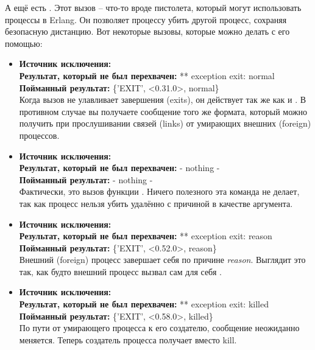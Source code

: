 А ещё есть .
Этот вызов \--- что\--то вроде пистолета, который могут использовать процессы в Erlang.
Он позволяет процессу убить другой процесс, сохраняя безопасную дистанцию.
Вот некоторые вызовы, которые можно делать с его помощью:
\begin{itemize}
    \item 
        \textbf{Источник исключения:} \\
    \textbf{Результат, который не был перехвачен:} ** exception exit: normal\\
    \textbf{Пойманный результат:} \{'EXIT', <0.31.0>, normal\}\\
    Когда вызов  не улавливает завершения (exits), он действует так же как и .
    В противном случае вы получаете сообщение того же формата, который можно получить при прослушивании связей (links) от умирающих внешних (foreign) процессов.
\item 
    \textbf{Источник исключения:} \\
    \textbf{Результат, который не был перехвачен:} - nothing -\\
    \textbf{Пойманный результат:} - nothing -\\
    Фактически, это вызов функции .
    Ничего полезного эта команда не делает, так как процесс нельзя убить удалённо с причиной  в качестве аргумента.
\item
    \textbf{Источник исключения:} \\
    \textbf{Результат, который не был перехвачен:} ** exception exit: reason\\
    \textbf{Пойманный результат:} \{'EXIT', <0.52.0>, reason\}\\
    Внешний (foreign) процесс завершает себя по причине \emph{reason}.
    Выглядит это так, как будто внешний процесс вызвал сам для себя .
\item
    \textbf{Источник исключения:} \\
    \textbf{Результат, который не был перехвачен:} ** exception exit: killed\\
    \textbf{Пойманный результат:} \{'EXIT', <0.58.0>, killed\}\\
    По пути от умирающего процесса к его создателю, сообщение неожиданно меняется.
    Теперь создатель процесса получает  вместо {kill}.

\end{itemize}
